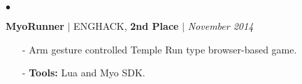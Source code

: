 \documentclass[11pt]{article}
\newenvironment{achievements}{\begin{list}{$\bullet$}{\topsep 0pt \itemsep -1.5pt \leftmargin 5pt}}{\vspace*{4pt}\end{list}}
\begin{document}
\begin{achievements}


\vspace{6pt}

\item\textbf{MyoRunner} {$|$ \scriptsize ENGHACK, \textbf{2nd Place} }  $|$  \href{https://github.com/nakulpathak3/myorunner}{\faGithub} \hfill \textit {November 2014}
\begin{itemize}
\item[-]Arm gesture controlled Temple Run type browser-based game.
\vspace{3pt}
\item[-]\textbf{Tools:} Lua and Myo SDK.
\end{itemize}




\end{achievements}
\end{document}
